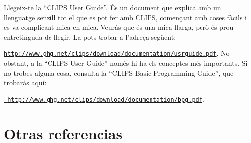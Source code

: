 \documentclass[11pt,svgnames]{scrbook}
\begin{document}
Llegeix-te la ``CLIPS User Guide''. És un document que explica amb un llenguatge
senzill tot el que es pot fer amb CLIPS, començant amb coses fàcils i es va
complicant mica en mica. Veuràs que és una mica llarga, però és prou
entretinguda de llegir. La pots trobar a l'adreça següent:

\href{http://www.ghg.net/clips/download/documentation/usrguide.pdf}{
\texttt{http://www.ghg.net/clips/download/documentation/usrguide.pdf}}.
No obstant, a la ``CLIPS User Guide'' només hi ha els conceptes més importants.
Si no trobes alguna cosa, consulta la ``CLIPS Basic Programming Guide'', que
trobaràs aquí:

\href{http://www.ghg.net/clips/download/documentation/bpg.pdf}{\texttt{
http://www.ghg.net/clips/download/documentation/bpg.pdf}}.

\section{Otras referencias}
\end{document}

